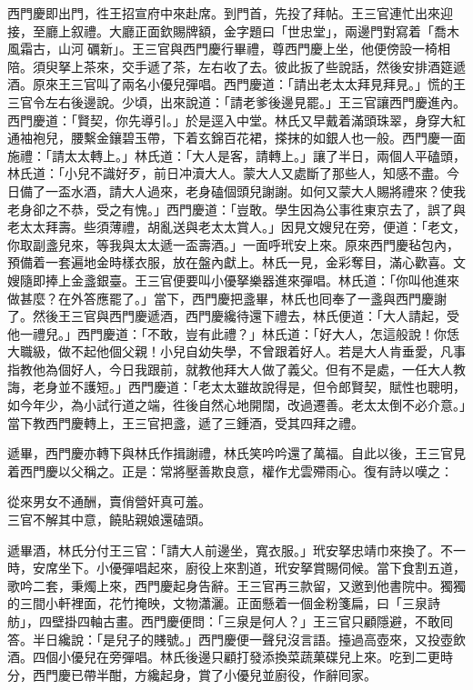 西門慶即出門，徃王招宣府中來赴席。到門首，先投了拜帖。王三官連忙出來迎接，至廳上叙禮。大廳正面欽賜牌額，金字題曰「世忠堂」，兩邊門對寫着「喬木風霜古，山河𥕧礪新」。王三官與西門慶行畢禮，尊西門慶上坐，他便傍設一椅相陪。須臾拏上茶來，交手遞了茶，左右收了去。彼此扳了些說話，然後安排酒筵遞酒。原來王三官叫了兩名小優兒彈唱。西門慶道：「請出老太太拜見拜見。」慌的王三官令左右後邊說。少頃，出來說道：「請老爹後邊見罷。」王三官讓西門慶進內。西門慶道：「賢契，你先導引。」於是逕入中堂。林氏又早戴着滿頭珠翠，身穿大紅通袖袍兒，腰繫金鑲碧玉帶，下着玄錦百花裙，搽抹的如銀人也一般。西門慶一面施禮：「請太太轉上。」林氏道：「大人是客，請轉上。」讓了半日，兩個人平磕頭，林氏道：「小兒不識好歹，前日冲瀆大人。蒙大人又處斷了那些人，知感不盡。今日備了一盃水酒，請大人過來，老身磕個頭兒謝謝。如何又蒙大人賜將禮來？使我老身卻之不恭，受之有愧。」西門慶道：「豈敢。學生因為公事徃東京去了，誤了與老太太拜壽。些須薄禮，胡亂送與老太太賞人。」因見文嫂兒在旁，便道：「老文，你取副盞兒來，等我與太太遞一盃壽酒。」{}一面呼玳安上來。原來西門慶毡包內，預備着一套遍地金時樣衣服，放在盤內獻上。林氏一見，金彩奪目，滿心歡喜。文嫂隨即捧上金盞銀臺。王三官便要叫小優拏樂器進來彈唱。{}林氏道：「你叫他進來做甚麼？在外答應罷了。」當下，西門慶把盞畢，林氏也囘奉了一盞與西門慶謝了。然後王三官與西門慶遞酒，西門慶纔待還下禮去，林氏便道：「大人請起，受他一禮兒。」西門慶道：「不敢，豈有此禮？」林氏道：「好大人，怎這般說！你恁大職級，做不起他個父親！小兒自幼失學，不曾跟着好人。若是大人肯垂愛，凡事指教他為個好人，今日我跟前，就教他拜大人做了義父。{}但有不是處，一任大人教誨，老身並不護短。」西門慶道：「老太太雖故說得是，但令郎賢契，賦性也聰明，如今年少，為小試行道之端，徃後自然心地開闊，改過遷善。老太太倒不必介意。」{}當下教西門慶轉上，王三官把盞，遞了三鍾酒，受其四拜之禮。

遞畢，西門慶亦轉下與林氏作揖謝禮，林氏笑吟吟還了萬福。自此以後，王三官見着西門慶以父稱之。正是：常將壓善欺良意，權作尤雲殢雨心。復有詩以嘆之：

\begin{myquote}
從來男女不通酬，賣俏營奸真可羞。\\三官不解其中意，饒貼親娘還磕頭。
\end{myquote}

遞畢酒，林氏分付王三官：「請大人前邊坐，寬衣服。」玳安拏忠靖巾來換了。不一時，安席坐下。小優彈唱起來，廚役上來割道，玳安拏賞賜伺候。當下食割五道，歌吟二套，秉燭上來，西門慶起身告辭。王三官再三款留，又邀到他書院中。獨獨的三間小軒裡面，花竹掩映，文物瀟灑。正面懸着一個金粉箋扁，曰「三泉詩舫」，四壁掛四軸古畫。西門慶便問：「三泉是何人？」王三官只顧隱避，不敢囘答。{}半日纔說：「是兒子的賤號。」西門慶便一聲兒沒言語。擡過高壺來，又投壺飲酒。四個小優兒在旁彈唱。林氏後邊只顧打發添換菜蔬菓碟兒上來。吃到二更時分，西門慶已帶半酣，方纔起身，賞了小優兒並廚役，作辭囘家。

